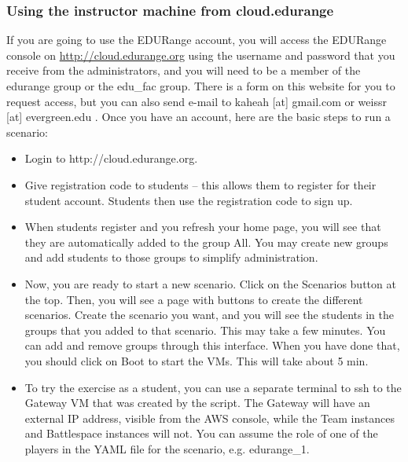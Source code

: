 \documentclass[11pt]{report}
\newcommand{\eat}[1]{}
\begin{document}
\subsubsection*{Using the instructor machine from cloud.edurange}
If you are going to use the EDURange account, you will access the EDURange console
on \url{http://cloud.edurange.org}
using the username and password that you receive from the administrators, 
and you will need to be a member of the edurange group or the edu\_fac group. 
There is a form on this website for you to request access, but you can also 
send e-mail to kaheah [at] gmail.com or weissr [at] evergreen.edu .  Once you have an account,
here are the basic steps to run a scenario:
\begin{itemize}
  \item Login to http://cloud.edurange.org.  %
  \item Give registration code to students -- this allows them to register for their student account.
    Students then use the registration code to sign up.
  \item When students register and you refresh your home page, you will see that they are automatically 
    added to the group All.  You may create new groups and add students to those groups to simplify 
    administration.
  \item Now, you are ready to start a new scenario.  Click on the Scenarios button at the top.
    Then, you will see a page with buttons to create the different scenarios.
    Create the scenario you want, and you will see
    the students in the groups that you added to that scenario. This may take a few minutes.
    You can add and remove groups through this interface.
    When you have done that, you should click on Boot to start the VMs.  This will take about 5 min.
  \item To try the exercise as a student, you can use a separate terminal to ssh to the Gateway VM
    that was created by the script.  The Gateway will have an external IP address, visible
    from the AWS console, while the Team %
    instances and Battlespace instances will not.
    You can assume the role of one of the players in the YAML file for the scenario, e.g.
    edurange\_1.  

\end{itemize}




  \eat{Describe the role of VPCs and VPNs in AWS.  What are the limits.
we need a video of this.
  At the upper right, there will be a dropdown tab
for the different AWS centers.  You want {\em  East (N Virginia)} and you should see a 
heading called {\bf Resources}.
Under that, click on the link to {\bf Running Instances}. You should see a list of instances.  You will
create your own instance of an instructor machine by taking a snapshot of an existing instructor instance,
 e.g. locasto-instructor.  }
\end{document}
